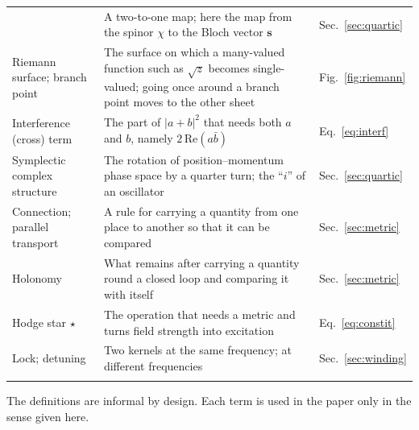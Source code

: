 \documentclass[%
 reprint, amsmath,amssymb, aps, prb, ]{revtex4-2}
\numberwithin{equation}{section}
\newcommand{\hodge}{\star}
\newcommand{\Bloch}{\mathbf{s}}
\begin{document}
\begin{table}[t!]
\begin{tabular}{p{3.2cm}p{8.6cm}p{3.8cm}}
& A two-to-one map; here the map from the spinor $\chi$ to the Bloch vector $\Bloch$
& Sec.~\ref{sec:quartic} \\
\addlinespace[0.3cm]
Riemann surface; branch point
& The surface on which a many-valued function such as $\sqrt{z}$ becomes single-valued; going once around a branch point moves to the other sheet
& Fig.~\ref{fig:riemann} \\
\addlinespace[0.3cm]
Interference (cross) term
& The part of $|a+b|^2$ that needs both $a$ and $b$, namely $2\,\mathrm{Re}(a\bar b)$
& Eq.~\eqref{eq:interf} \\
\addlinespace[0.3cm]
Symplectic complex structure
& The rotation of position--momentum phase space by a quarter turn; the ``$i$'' of an oscillator
& Sec.~\ref{sec:quartic} \\
\addlinespace[0.3cm]
Connection; parallel transport
& A rule for carrying a quantity from one place to another so that it can be compared
& Sec.~\ref{sec:metric} \\
\addlinespace[0.3cm]
Holonomy
& What remains after carrying a quantity round a closed loop and comparing it with itself
& Sec.~\ref{sec:metric} \\
\addlinespace[0.3cm]
Hodge star $\hodge$
& The operation that needs a metric and turns field strength into excitation
& Eq.~\eqref{eq:constit} \\
\addlinespace[0.3cm]
Lock; detuning
& Two kernels at the same frequency; at different frequencies
& Sec.~\ref{sec:winding} \\
\addlinespace[0.2cm]
\bottomrule
\end{tabular}
\vspace{0.2cm}
\begin{minipage}{0.95\textwidth}
\justifying\footnotesize
The definitions are informal by design. Each term is used in the paper only in the sense given here.
\end{minipage}
\end{table}

\clearpage
\end{document}

